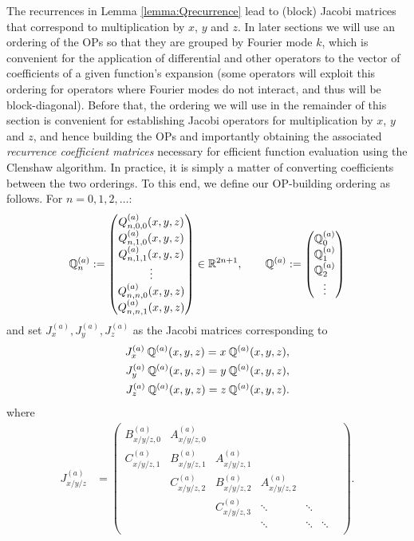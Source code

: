 \documentclass[11pt, oneside]{article}   	%
\begin{document}
The recurrences in Lemma \ref{lemma:Qrecurrence} lead to (block) Jacobi matrices that correspond to multiplication by $x$, $y$ and $z$. In later sections we will use an ordering of the OPs so that they are grouped by Fourier mode $k$, which is convenient for the application of differential and other operators to the vector of coefficients of a given function's expansion (some operators will exploit this ordering for operators where Fourier modes do not interact, and thus will be block-diagonal). Before that, the ordering we will use in the remainder of this section is convenient for establishing Jacobi operators for multiplication by $x$, $y$ and $z$, and hence building the OPs and importantly obtaining the associated \textit{recurrence coefficient matrices} necessary for efficient function evaluation using the Clenshaw algorithm. In practice, it is simply a matter of converting coefficients between the two orderings. To this end, we define our OP-building ordering as follows. For $n=0,1,2,\dots$:
\begin{align*}
	\mathbb{{Q}}^{(a)}_{n} := 
		\begin{pmatrix}
			Q^{(a)}_{n,0,0}(x,y,z) \\
			Q^{(a)}_{n,1,0}(x,y,z) \\
			Q^{(a)}_{n,1,1}(x,y,z) \\
			\vdots \\
			Q^{(a)}_{n,n,0}(x,y,z) \\
			Q^{(a)}_{n,n,1}(x,y,z)
		\end{pmatrix} \in \mathbb{R}^{2n+1}, 
	\quad \quad 
	\mathbb{{Q}}^{(a)} := 
		\begin{pmatrix}
			\mathbb{{Q}}^{(a)}_0 \\
			\mathbb{{Q}}^{(a)}_1 \\
			\mathbb{{Q}}^{(a)}_2 \\
			\vdots \\
		\end{pmatrix}
\end{align*}
and set $ J_x^{(a)},  J_y^{(a)},  J_z^{(a)}$ as the Jacobi matrices corresponding to
\begin{align}
	J_x^{(a)} \: \mathbb{{Q}}^{(a)}(x,y,z) = x \: \mathbb{{Q}}^{(a)}(x,y,z), \nonumber \\
	J_y^{(a)} \: \mathbb{{Q}}^{(a)}(x,y,z) = y \: \mathbb{{Q}}^{(a)}(x,y,z), \label{eqn:jacobimatricesdefinitionalt} \\
	J_z^{(a)} \: \mathbb{{Q}}^{(a)}(x,y,z) = z \: \mathbb{{Q}}^{(a)}(x,y,z). \nonumber
\end{align}
where
\begin{align*}
	J_{x/y/z}^{(a)} &= 
		\begin{pmatrix}
			B^{(a)}_{x/y/z, 0} & A^{(a)}_{x/y/z, 0} & & & & \\
			C^{(a)}_{x/y/z, 1} & B^{(a)}_{x/y/z, 1} & A^{(a)}_{x/y/z, 1} & & & \\
			& C^{(a)}_{x/y/z, 2} & B^{(a)}_{x/y/z, 2} & A^{(a)}_{x/y/z, 2} & & & \\
			& & C^{(a)}_{x/y/z, 3} & \ddots & \ddots & \\
			& & & \ddots & \ddots & \ddots \\
		\end{pmatrix}.
\end{align*}
\end{document}
